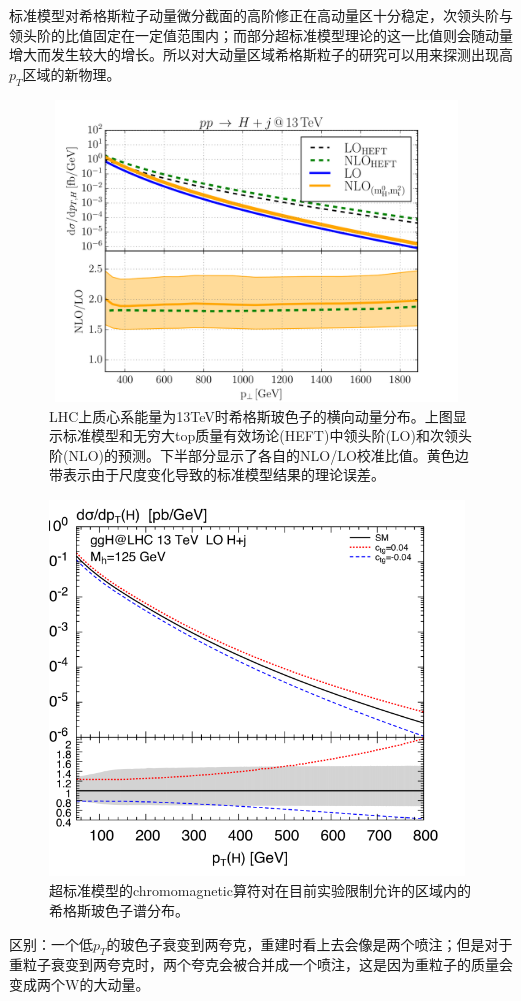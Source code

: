 标准模型对希格斯粒子动量微分截面的高阶修正在高动量区十分稳定，次领头阶与领头阶的比值固定在一定值范围内；而部分超标准模型理论的这一比值则会随动量增大而发生较大的增长。所以对大动量区域希格斯粒子的研究可以用来探测出现高$p_T$区域的新物理。

\begin{figure}[H]
 \centering
 \includegraphics[height=8cm, width=11cm]{pictures/SM_NLO:LO.png}
  \caption{LHC上质心系能量为13TeV时希格斯玻色子的横向动量分布。上图显示标准模型和无穷大top质量有效场论(HEFT)中领头阶(LO)和次领头阶(NLO)的预测。下半部分显示了各自的NLO/LO校准比值。黄色边带表示由于尺度变化导致的标准模型结果的理论误差。}
 \label{fig:2.1}
\end{figure}

\begin{figure}[H]
 \centering
 \includegraphics[height=10cm, width=11cm]{pictures/BSM_NLO:LO.png}
  \caption{超标准模型的chromomagnetic算符对在目前实验限制允许的区域内的希格斯玻色子谱分布。}
 \label{fig:2.2}
\end{figure}
区别：一个低$p_T$的玻色子衰变到两夸克，重建时看上去会像是两个喷注；但是对于重粒子衰变到两夸克时，两个夸克会被合并成一个喷注，这是因为重粒子的质量会变成两个W的大动量。


